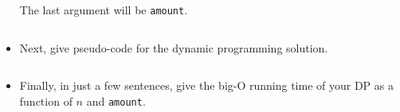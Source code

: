 \documentclass{ks-pset}
\begin{document}
\begin{problem}
\begin{itemize}
      The last argument will be  \texttt{amount}.

      \begin{aside}
        \inputminted{python}{template/recursive_change.py}
      \end{aside}

    \item Next, give pseudo-code for the dynamic programming solution.

      \begin{aside}
        \inputminted{python}{template/changeDP.py}
      \end{aside}

    \item Finally, in just a few sentences, give the big-O running time of your
      DP as a function of \(n\) and \texttt{amount}.

  \end{itemize}

\end{problem}

\begin{solution}

\end{solution}
\end{document}
